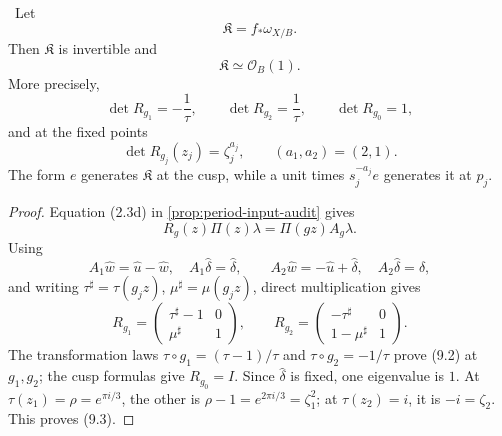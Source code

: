 \begin{lemma}
\label{lem:hodge-line-audit}
\Verified\ Let
\[
 \mathfrak K=f_*\omega_{X/B}.
\]
Then \(\mathfrak K\) is invertible and
\[
 \mathfrak K\simeq\mathcal O_B(1).
\tag{9.1}
\]
More precisely,
\[
 \det R_{g_1}=-\frac1\tau,\qquad
 \det R_{g_2}=\frac1\tau,\qquad
 \det R_{g_0}=1,
\tag{9.2}
\]
and at the fixed points
\[
 \det R_{g_j}(z_j)=\zeta_j^{a_j},
 \qquad (a_1,a_2)=(2,1).
\tag{9.3}
\]
The form \(e\) generates \(\mathfrak K\) at the cusp, while a unit times
\(s_j^{-a_j}e\) generates it at \(p_j\).
\end{lemma}

\begin{proof}
Equation (2.3d) in \cref{prop:period-input-audit} gives
\[
 R_g(z)\Pi(z)\lambda=\Pi(gz)A_g\lambda.
\]
Using
\[
 A_1\widehat w=\widehat u-\widehat w,\quad
 A_1\widehat\delta=\widehat\delta,\qquad
 A_2\widehat w=-\widehat u+\widehat\delta,\quad
 A_2\widehat\delta=\widehat\delta,
\]
and writing \(\tau^\sharp=\tau(g_jz)\),
\(\mu^\sharp=\mu(g_jz)\), direct multiplication gives
\[
 R_{g_1}=
 \begin{pmatrix}\tau^\sharp-1&0\\ \mu^\sharp&1\end{pmatrix},
 \qquad
 R_{g_2}=
 \begin{pmatrix}-\tau^\sharp&0\\1-\mu^\sharp&1\end{pmatrix}.
\]
The transformation laws
\(\tau\circ g_1=(\tau-1)/\tau\) and
\(\tau\circ g_2=-1/\tau\) prove (9.2) at \(g_1,g_2\); the cusp formulas
give \(R_{g_0}=I\).  Since \(\widehat\delta\) is fixed, one eigenvalue is
\(1\).  At \(\tau(z_1)=\rho=e^{\pi i/3}\), the other is
\(\rho-1=e^{2\pi i/3}=\zeta_1^2\); at \(\tau(z_2)=i\), it is
\(-i=\zeta_2\).  This proves (9.3).


\end{proof}
